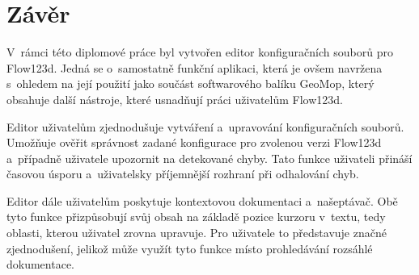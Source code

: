 \documentclass[FM,bw,DP]{tulthesis}
\begin{document}
%
%
%
%
%
%




\chapter*{Závěr}
V~rámci této diplomové práce byl vytvořen editor konfiguračních souborů pro Flow123d. Jedná se o~samostatně funkční aplikaci, která je ovšem navržena s~ohledem na její použití jako součást softwarového balíku GeoMop, který obsahuje další nástroje, které usnadňují práci uživatelům Flow123d.

Editor uživatelům zjednodušuje vytváření a~upravování konfiguračních souborů. Umožňuje ověřit správnost zadané konfigurace pro zvolenou verzi Flow123d a~případně uživatele upozornit na detekované chyby. Tato funkce uživateli přináší časovou úsporu a~uživatelsky příjemnější rozhraní při odhalování chyb.

Editor dále uživatelům poskytuje kontextovou dokumentaci a~našeptávač. Obě tyto funkce přizpůsobují svůj obsah na základě pozice kurzoru v~textu, tedy oblasti, kterou uživatel zrovna upravuje. Pro uživatele to představuje značné zjednodušení, jelikož může využít tyto funkce místo prohledávání rozsáhlé dokumentace.
\end{document}
